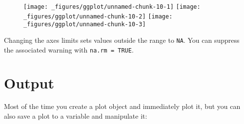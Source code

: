 \begin{Shaded}
\begin{Highlighting}[]
\StringTok{  }\NormalTok{(} \NormalTok{)}

\StringTok{  }\NormalTok{(} \NormalTok{) +}\StringTok{ }
\StringTok{  }\NormalTok{(}\NormalTok{, }\NormalTok{) +}\StringTok{ }
\StringTok{  }\NormalTok{(}\NormalTok{, }\NormalTok{)}
  
\StringTok{  }\NormalTok{(} \NormalTok{, } \NormalTok{) +}\StringTok{ }
\StringTok{  }\NormalTok{(}\NormalTok{, }\NormalTok{)}
\end{Highlighting}
\end{Shaded}

\begin{figure}[H]
  \texttt{[image: \_figures/ggplot/unnamed-chunk-10-1]}%
  \texttt{[image: \_figures/ggplot/unnamed-chunk-10-2]}%
  \texttt{[image: \_figures/ggplot/unnamed-chunk-10-3]}
\end{figure}

Changing the axes limits sets values outside the range to \texttt{NA}.
You can suppress the associated warning with \texttt{na.rm\ =\ TRUE}.

\hypertarget{sec:output}{\section{Output}\label{sec:output}}

Most of the time you create a plot object and immediately plot it, but
you can also save a plot to a variable and manipulate it:

\begin{Shaded}
\begin{Highlighting}[]
\StringTok{ } 
\StringTok{  }\NormalTok{()}
\end{Highlighting}
\end{Shaded}

